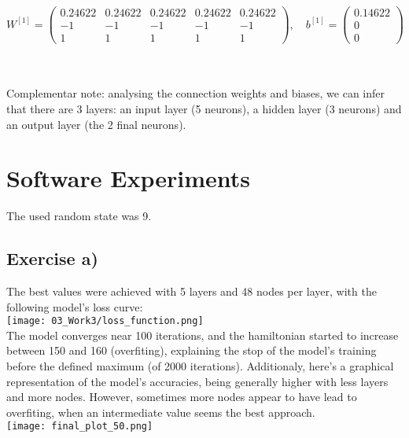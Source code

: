 \documentclass{article}
\begin{document}
\[
W^{[1]} = \begin{pmatrix} 0.24622 & 0.24622 & 0.24622 & 0.24622 & 0.24622 \\ -1 & -1 & -1 & -1 & -1 \\ 1 & 1 & 1 & 1 & 1 \end{pmatrix}, \quad b^{[1]} = \begin{pmatrix} 0.14622 \\ 0 \\ 0 \end{pmatrix}
\]

\\
\\
Complementar note: analysing the connection weights and biases, we can infer that there are 3 layers: an input layer (5 neurons), a hidden layer (3 neurons) and an output layer (the 2 final neurons).

\section{Software Experiments}
The used random state was 9.

\subsection{Exercise a)}
The best values were achieved with 5 layers and 48 nodes per layer, with the following model's loss curve:
\\
\texttt{[image: 03\_Work3/loss\_function.png]}\\[1ex] %
The model converges near 100 iterations, and the hamiltonian started to increase between 150 and 160 (overfiting), explaining the stop of the model's training before the defined maximum (of 2000 iterations). 
\newpage
Additionaly, here's a graphical representation of the model's accuracies, being generally higher with less layers and more nodes. However, sometimes more nodes appear to have lead to overfiting, when an intermediate value seems the best approach.
\\
\texttt{[image: final\_plot\_50.png]}\\[1ex] %
\end{document}
